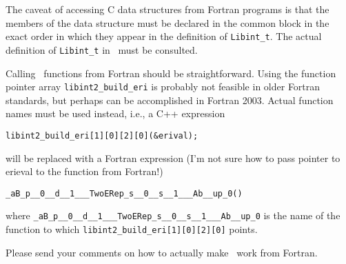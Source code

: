 \documentclass[12pt]{article}
\begin{document}
The caveat of accessing C data structures from Fortran programs is that the members of the data structure must be
declared in the common block in the exact order in which they appear in the definition of {\tt Libint\_t}.
The actual definition of {\tt Libint\_t} in \libinth\ must be consulted.

Calling \LIBINT\ functions from Fortran should be straightforward. Using the function pointer array {\tt libint2\_build\_eri} is probably
not feasible in older Fortran standards, but perhaps can be accomplished in Fortran 2003. Actual function names must be used instead, i.e.,
a C++ expression
\begin{verbatim}
libint2_build_eri[1][0][2][0](&erival);
\end{verbatim}
will be replaced with a Fortran expression (I'm not sure how to pass pointer to erieval to the function from Fortran!)
\begin{verbatim}
_aB_p__0__d__1___TwoERep_s__0__s__1___Ab__up_0()
\end{verbatim}
where {\tt \_aB\_p\_\_0\_\_d\_\_1\_\_\_TwoERep\_s\_\_0\_\_s\_\_1\_\_\_Ab\_\_up\_0} is the name of the function
to which {\tt libint2\_build\_eri[1][0][2][0]} points.

Please send your comments on how to actually make \LIBINT\ work from Fortran.



\end{document}
